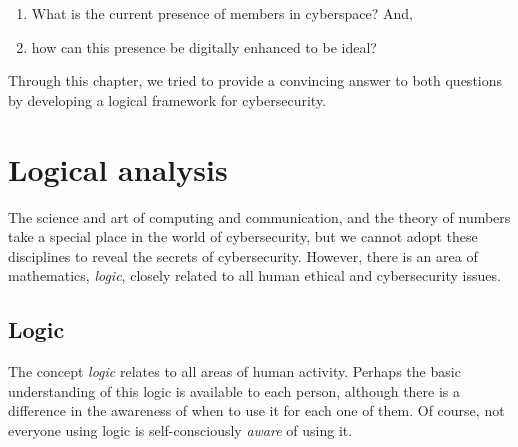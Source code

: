 \begin{enumerate}
\item What is the current presence of members in cyberspace? And,
\item how can this presence be digitally enhanced to be ideal?
\end{enumerate}

Through this chapter, we tried to provide a convincing answer to both
questions by developing a  logical framework for cybersecurity. 
\fi



\section{Logical analysis}

The science and art of computing and communication, and   the theory of numbers take a special place in the world of cybersecurity, but we cannot adopt these disciplines to reveal the secrets of cybersecurity. However, there is an area of mathematics, {\em logic}, closely related to all human ethical and cybersecurity issues.

\subsection{Logic}\label{logicsec}

The concept {\em logic} relates to all areas of human activity. Perhaps the basic understanding of this logic is available to each person, although there is a difference in the awareness of when to use it for each one of them. Of course, not everyone using logic is self-consciously {\em aware} of using it.

